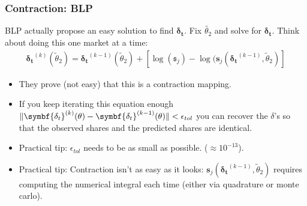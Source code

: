 \documentclass[aspectratio=169,11pt]{beamer}
\begin{document}
\begin{frame}
\frametitle{Contraction: BLP}
BLP actually propose an easy solution to find $\symbf{\delta_t}$. Fix $\widetilde{\theta_2}$ and solve for $\symbf{\delta_t}$. Think about doing this one market at a time:
\begin{align*}
\symbf{\delta_t}^{(k)}(\widetilde{\theta}_2) = \symbf{\delta_t}^{(k-1)}(\widetilde{\theta}_2) + \left[ \log(\symbf{\mathfrak{s}}_{j}) - \log(\symbf{s}_{j}(\symbf{\delta_t}^{(k-1)}, \widetilde{\theta}_2) \right]
\end{align*}
 \begin{itemize}
 \item They prove (not easy) that this is a \alert{contraction mapping}.
 \item If you keep iterating this equation enough $\norm{\symbf{\delta_{t}}^{(k)}(\theta) - \symbf{\delta_{t}}^{(k-1)}(\theta)} < \epsilon_{tol}$ you can recover the $\delta$'s so that the observed shares and the predicted shares are identical.
 \item Practical tip: $\epsilon_{tol}$ needs to be as small as possible. ($\approx 10^{-13}$).
 \item Practical tip: Contraction isn't as easy as it looks:  $\symbf{s}_{j}(\symbf{\delta_t}^{(k-1)}, \widetilde{\theta}_2)$ requires computing the numerical integral each time (either via quadrature or monte carlo).
  \end{itemize}
 \end{frame}
 
\end{document}

